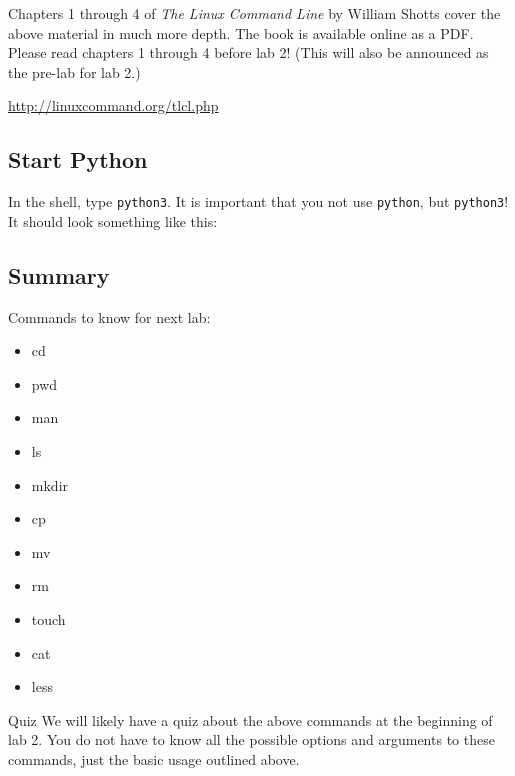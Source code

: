 \documentclass[11pt]{cselabheader}
\begin{document}
Chapters 1 through 4 of \textit{The Linux Command Line} by William Shotts cover
the above material in much more depth. The book is available online as a PDF.
Please read chapters 1 through 4 before lab 2! (This will also be announced as
the pre-lab for lab 2.)
\begin{center}
  \url{http://linuxcommand.org/tlcl.php}
\end{center}

\subsection{Start Python}

In the shell, type \texttt{python3}. It is important that you not use
\texttt{python}, but \texttt{python3}! It should look something like this:


\subsection{Summary}

Commands to know for next lab:
\begin{multicols}{3}
\begin{itemize}
  \item cd
  \item pwd
  \item man
  \item ls
  \item mkdir
  \item cp
  \item mv
  \item rm
  \item touch
  \item cat
  \item less
\end{itemize}
\end{multicols}

\begin{warningbox}{Quiz}
  We will likely have a quiz about the above commands at the beginning of lab 2.
  You do not have to know all the possible options and arguments to these
  commands, just the basic usage outlined above.
\end{warningbox}
\end{document}
